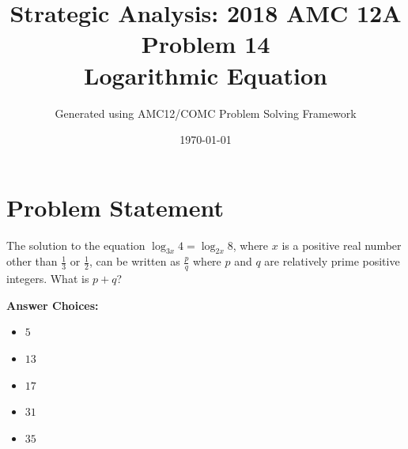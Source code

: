 \documentclass[12pt]{article}
\title{\textbf{Strategic Analysis: 2018 AMC 12A Problem 14\\Logarithmic Equation}}
\author{Generated using AMC12/COMC Problem Solving Framework}
\date{\today}
\begin{document}
\maketitle

\section*{Problem Statement}

The solution to the equation $\log_{3x} 4 = \log_{2x} 8$, where $x$ is a positive real number other than $\frac{1}{3}$ or $\frac{1}{2}$, can be written as $\frac{p}{q}$ where $p$ and $q$ are relatively prime positive integers. What is $p + q$?

\textbf{Answer Choices:}
\begin{itemize}
    \item[(A)] $5$
    \item[(B)] $13$
    \item[(C)] $17$
    \item[(D)] $31$
    \item[(E)] $35$
\end{itemize}
\end{document}
